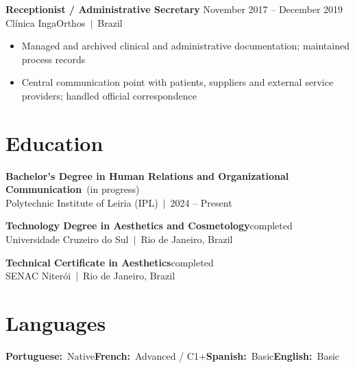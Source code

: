 \documentclass[10pt,a4paper]{article}
\begin{document}
\vspace{3pt}
{\small\bfseries Receptionist / Administrative Secretary}\hfill{\small\color{subtle} November 2017 -- December 2019}\\
{\small\color{accent} Clínica IngaOrthos~$|$~Brazil}
\begin{itemize}\small
  \item Managed and archived clinical and administrative documentation; maintained process records
  \item Central communication point with patients, suppliers and external service providers; handled official correspondence
\end{itemize}

\section{Education}

{\small\bfseries Bachelor's Degree in Human Relations and Organizational Communication}~{\small\color{subtle}(in progress)}\\
{\small Polytechnic Institute of Leiria (IPL)~$|$~2024 -- Present}

\vspace{3pt}
{\small\bfseries Technology Degree in Aesthetics and Cosmetology}\hfill{\small\color{subtle}completed}\\
{\small Universidade Cruzeiro do Sul~$|$~Rio de Janeiro, Brazil}

\vspace{3pt}
{\small\bfseries Technical Certificate in Aesthetics}\hfill{\small\color{subtle}completed}\\
{\small SENAC Niterói~$|$~Rio de Janeiro, Brazil}

\section{Languages}
{\small
\textbf{Portuguese:}~Native\quad\textbf{French:}~Advanced / C1+\quad\textbf{Spanish:}~Basic\quad\textbf{English:}~Basic
}
\end{document}
